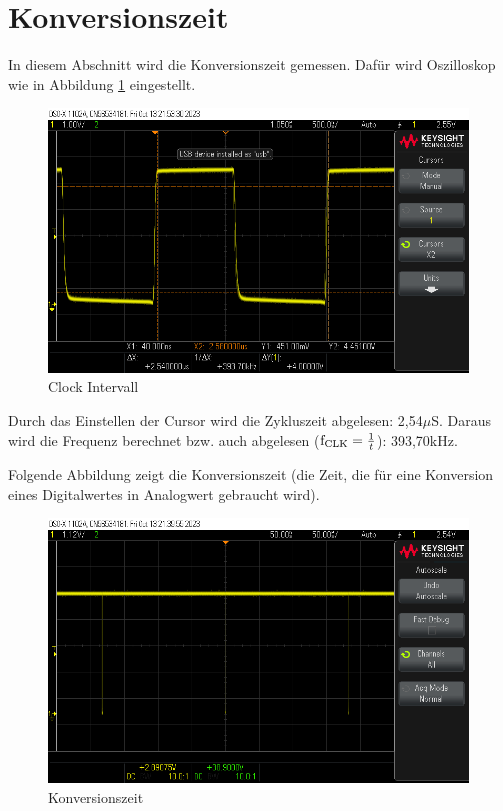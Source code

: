 \section{Konversionszeit}
In diesem Abschnitt wird die Konversionszeit gemessen. Dafür wird Oszilloskop
wie in Abbildung \ref{fig: Clock Intervall} eingestellt.

\begin{figure}[H]
	\centering
	\includegraphics[height=7cm]{images/Clock-interval.png} 
	\caption[]{Clock Intervall}
	\label{fig: Clock Intervall}
\end{figure}

Durch das Einstellen der Cursor wird die Zykluszeit abgelesen: 2,54$\mu$S.
Daraus wird die Frequenz berechnet bzw. auch abgelesen ($\text{f\textsubscript{CLK}}=\frac{1}{t}$): 
393,70kHz.\par

Folgende Abbildung zeigt die Konversionszeit (die Zeit, die für eine Konversion
eines Digitalwertes in Analogwert gebraucht wird).

\begin{figure}[H]
	\centering
	\includegraphics[height=7cm]{images/Conversion-Time.png} 
	\caption[]{Konversionszeit}
	\label{fig: Konversionszeit}
\end{figure}

